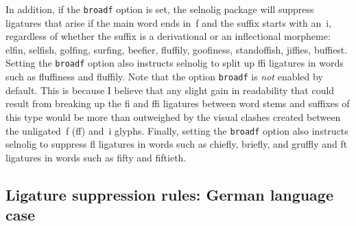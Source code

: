 \documentclass[11pt]{article}
\newcommand{\pkg}[1]{\textsf{#1}}
\newcommand{\opt}[1]{\texttt{#1}}
\begin{document}
In addition, if the \opt{broadf} option is set, the \pkg{selnolig} package will suppress ligatures that arise if the main word ends in~f and the suffix starts with an~i, regardless of whether the suffix is a derivational or an inflectional morpheme: elfin, selfish, golfing, surfing, beefier, fluffily, goofiness, standoffish, jiffies, buffiest. Setting the \opt{broadf} option also instructs \pkg{selnolig} to split up ffi ligatures in words such as fluffiness and fluffily. Note that the option \opt{broadf} is \emph{not} enabled by default. This is because I believe that any slight gain in readability that could result from breaking up the fi and ffi ligatures between word stems and suffixes of this type would be more than outweighed by the visual clashes created between the unligated~f (ff) and~i glyphs. Finally, setting the \opt{broadf} option also instructs \pkg{selnolig} to suppress fl ligatures in words such as chiefly, briefly, and gruffly and ft ligatures in words such as fifty and fiftieth.



\subsection{Ligature suppression rules: German language case}
\end{document}
